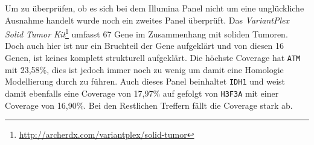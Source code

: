 \begin{table}[]
    \centering
    \caption{VariantPlex Solid Tumor Kit Coverage, Transkriptlänge ist mit UTRs und CDS angegeben.}
    \label{tab:variantplex_coverage}
\end{table}

Um zu überprüfen, ob es sich bei dem Illumina Panel nicht um eine unglückliche Ausnahme handelt wurde noch ein zweites Panel überprüft. Das \emph{VariantPlex Solid Tumor Kit}\footnote{\url{http://archerdx.com/variantplex/solid-tumor}} umfasst 67 Gene im Zusammenhang mit soliden Tumoren. Doch auch hier ist nur ein Bruchteil der Gene aufgeklärt und von diesen 16 Genen, ist keines komplett strukturell aufgeklärt. Die höchste Coverage hat \texttt{ATM} mit 23,58\%, dies ist jedoch immer noch zu wenig um damit eine Homologie Modellierung durch zu führen. Auch dieses Panel beinhaltet \texttt{IDH1} und weist damit ebenfalls eine Coverage von 17,97\% auf gefolgt von \texttt{H3F3A} mit einer Coverage von 16,90\%. Bei den Restlichen Treffern fällt die Coverage stark ab.

